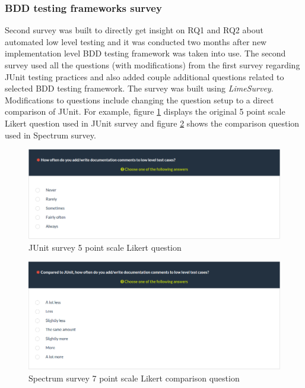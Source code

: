     \subsubsection{BDD testing frameworks survey}
    Second survey was built to directly get insight on RQ1 and RQ2 about automated low level testing
    and it was conducted two months after new implementation level BDD testing framework was taken into use.
    The second survey used all the questions (with modifications) from the first survey regarding JUnit testing practices and
    also added couple additional questions related to selected BDD testing framework. The survey was built using \textit{LimeSurvey}.
    Modifications to questions include changing the question setup to a direct comparison of JUnit.
    For example, figure \ref{fig:survey-junit-comments} displays the original 5 point scale Likert question used in JUnit survey and
    figure \ref{fig:survey-bdd-comments} shows the comparison question used in Spectrum survey.
    \begin{figure}[H]
      \begin{center}
        \includegraphics[width=13.7cm]{images/survey-org-comments.png}
        \caption{JUnit survey 5 point scale Likert question}
        \label{fig:survey-junit-comments}
      \end{center}
    \end{figure}
    \begin{addmargin}[0em]{0em}
    \end{addmargin}
    \begin{figure}[ht]
      \begin{center}
        \includegraphics[width=13.7cm]{images/survey-bdd-comments.png}
        \caption{Spectrum survey 7 point scale Likert comparison question}
        \label{fig:survey-bdd-comments}
      \end{center}
    \end{figure}

